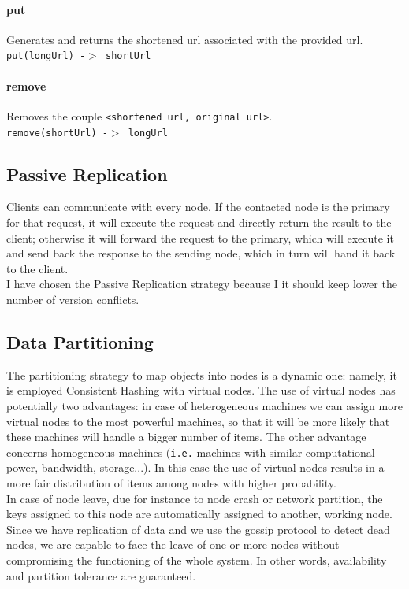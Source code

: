 \documentclass{article}
\begin{document}
\paragraph{put}
Generates and returns the shortened url associated with the provided url. \\
\texttt{put(longUrl) -$>$  shortUrl}

\paragraph{remove}
Removes the couple \texttt{<shortened url, original url>}.\\
\texttt{remove(shortUrl) -$>$  longUrl}


\subsection{Passive Replication}
Clients can communicate with every node. If the contacted node is the primary for that request, it will execute the request and directly return the result to the client; otherwise it will forward the request to the primary, which will execute it and send back the response to the sending node, which in turn will hand it back to the client. \\ 
I have chosen the Passive Replication strategy because I it should keep lower the number of version conflicts.

\subsection{Data Partitioning}
The partitioning strategy to map objects into nodes is a dynamic one: namely, it is employed Consistent Hashing with virtual nodes. The use of virtual nodes has potentially two advantages: in case of heterogeneous machines we can assign more virtual nodes to the most powerful machines, so that it will be more likely that these machines will handle a bigger number of items. The other advantage concerns homogeneous machines (\texttt{i.e.} machines with similar computational power, bandwidth, storage...). In this case the use of virtual nodes results in a more fair distribution of items among nodes with higher probability. \\ In case of node leave, due for instance to node crash or network partition, the keys assigned to this node are automatically assigned to another, working node. Since we have replication of data and we use the gossip protocol to detect dead nodes, we are capable to face the leave of one or more nodes without compromising the functioning of the whole system. In other words, availability and partition tolerance are guaranteed.
\end{document}

